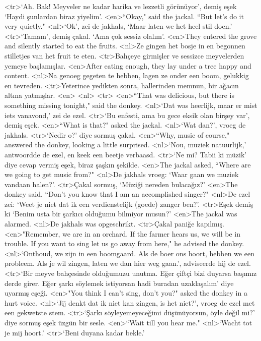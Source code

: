 <tr>`Ah. Bak! Meyveler ne kadar harika ve lezzetli görünüyor', demiş eşek `Haydi şunlardan biraz yiyelim'.
<en>“Okay," said the jackal. “But let’s do it very quietly." 
<nl>`Ok', zei de jakhals, `Maar laten we het heel stil doen.'
<tr>`Tamam', demiş çakal. `Ama çok sessiz olalım'. 
<en>They entered the grove and silently started to eat the fruits. 
<nl>Ze gingen het bosje in en begonnen stilletjes van het fruit te eten.
<tr>Bahçeye girmişler ve sessizce meyvelerden yemeye başlamışlar.
<en>After eating enough, they lay under a tree happy and content. 
<nl>Na genoeg  gegeten te hebben, lagen ze onder een boom, gelukkig en tevreden.
<tr>Yeterince yedikten sonra, hallerinden memnun, bir ağacın altına yatmışlar.
<en>
<nl>
<tr>
<en>“That was delicious, but there is something missing tonight," said the donkey. 
<nl>`Dat was heerlijk, maar er mist iets vanavond,' zei de ezel.
<tr>`Bu enfesti, ama bu gece eksik olan birşey var', demiş eşek.
<en>“What is that?" asked the jackal. 
<nl>`Wat dan?', vroeg de jakhals.
<tr>`Nedir o?' diye sormuş çakal.
<en>“Why, music of course," answered the donkey, looking a little surprised. 
<nl>`Nou, muziek natuurlijk,' antwoordde de ezel, en keek een beetje verbaasd.
<tr>`Ne mi? Tabii ki müzik' diye cevap vermiş eşek, biraz şaşkın şekilde.
<en>The jackal asked, “Where are we going to get music from?" 
<nl>De jakhals vroeg: `Waar gaan we muziek vandaan halen?'.
<tr>Çakal sormuş, `Müziği nereden bulacağız?' 
<en>The donkey said. “Don’t you know that I am an accomplished singer?" 
<nl>De ezel zei: `Weet je niet dat ik een verdienstelijk (goede) zanger ben?'.
<tr>Eşek demiş ki `Benim usta bir şarkıcı olduğumu bilmiyor musun?'
<en>The jackal was alarmed. 
<nl>De jakhals was opgeschrikt.
<tr>Çakal paniğe kapılmış.
<en>"Remember, we are in an orchard. If the farmer hears us, we will be in trouble. If you want to sing let us go away from here," he advised the donkey. 
<nl>`Onthoud, we zijn in een boomgaard. Als de boer ons hoort, hebben  we een  probleem. Als je wil zingen, laten we  dan hier weg gaan.', adviseerde hij de ezel.
<tr>`Bir meyve bahçesinde olduğumuzu unutma. Eğer çiftçi bizi duyarsa başımız derde girer. Eğer şarkı söylemek istiyorsan hadi buradan uzaklaşalım' diye uyarmış eşeği.
<en>"You think I can't sing, don't you?" asked the donkey in a hurt voice. 
<nl>`Jij denkt dat ik niet kan zingen, is het niet?', vroeg de ezel met een gekwetste stem.
<tr>`Şarkı söyleyemeyeceğimi düşünüyorsun, öyle değil mi?' diye sormuş eşek üzgün bir sesle.
<en>“Wait till you hear me." 
<nl>`Wacht tot je mij hoort.'
<tr>`Beni duyana kadar bekle.'
